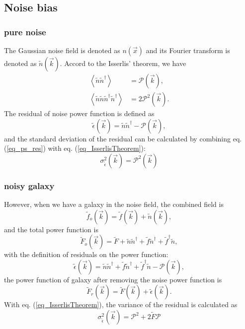 \subsection{Noise bias}
\label{sec_Method_noise}

\subsubsection{pure noise}

The Gaussian noise field is denoted as $n(\vec{x})$ and its Fourier transform
is denoted as $\tilde{n}(\vec{k})$. Accord to the Isserlis' theorem, we have
\begin{equation}\label{eq_IsserlisTheorem}
\begin{split}
    \left\langle\tilde{n}\tilde{n}^{\dagger}\right\rangle
    &=\mathcal{P}(\vec{k}),\\
    \left\langle\tilde{n}\tilde{n}\tilde{n}^\dagger\tilde{n}^\dagger\right\rangle
    &=2\mathcal{P}^2(\vec{k}).
\end{split}
\end{equation}
The residual of noise power function is defined as
\begin{equation}\label{eq_ps_res}
    \tilde{\epsilon}(\vec{k})=\tilde{n}\tilde{n}^\dagger
    -\mathcal{P}(\vec{k}),
\end{equation}
and the standard deviation of the residual can be calculated by combining
eq.(\ref{eq_ps_res}) with eq.  (\ref{eq_IsserlisTheorem}):
\begin{equation}
\sigma^2_{\tilde{\epsilon}}(\vec{k})=\mathcal{P}^2(\vec{k})
\end{equation}

\subsubsection{noisy galaxy}
However, when we have a galaxy in the noise field, the combined field is
\begin{equation}
    \tilde{f}_o(\vec{k})=\tilde{f}(\vec{k})+\tilde{n}(\vec{k}),
\end{equation}
and the total power function is
\begin{equation}
    \tilde{F}_o(\vec{k})= \tilde{F}+\tilde{n}\tilde{n}^\dagger
    +\tilde{f}\tilde{n}^{\dagger}+\tilde{f}^{\dagger}\tilde{n},
\end{equation}
with the definition of residuals on the power function:
\begin{equation}\label{eq_ps_res_gal}
    \tilde{\epsilon}(\vec{k})=\tilde{n}\tilde{n}^\dagger
    +\tilde{f}\tilde{n}^{\dagger}+\tilde{f}^{\dagger}\tilde{n}
    -\mathcal{P}(\vec{k}),
\end{equation}
the power function of galaxy after removing the noise power function is
\begin{equation}
    \tilde{F}_r(\vec{k})=\tilde{F}(\vec{k})+\tilde{\epsilon}(\vec{k}).
\end{equation}
With eq. (\ref{eq_IsserlisTheorem}), the variance of the residual is calculated
as
\begin{equation}
    \sigma^2_{\tilde{\epsilon}}(\vec{k})=\mathcal{P}^2+2\tilde{F}\mathcal{P}
\end{equation}

